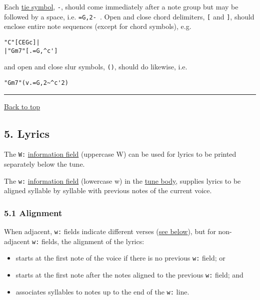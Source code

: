 Each \protect\hyperlink{ties_and_slurs}{tie symbol}, \texttt{-}, should
come immediately after a note group but may be followed by a space, i.e.
\texttt{=G,2-\ }. Open and close chord delimiters, \texttt{{[}} and
\texttt{{]}}, should enclose entire note sequences (except for chord
symbols), e.g.

\begin{verbatim}
"C"[CEGc]|
|"Gm7"[.=G,^c']
\end{verbatim}

and open and close slur symbols, \texttt{()}, should do likewise, i.e.

\begin{verbatim}
"Gm7"(v.=G,2~^c'2)
\end{verbatim}

\begin{center}\rule{0.5\linewidth}{\linethickness}\end{center}

\protect\hyperlink{}{Back to top}

\hypertarget{lyrics}{\subsection{5. Lyrics}\label{lyrics}}

The \texttt{W:}
\protect\hyperlink{information_field_definition}{information field}
(uppercase W) can be used for lyrics to be printed separately below the
tune.

The \texttt{w:}
\protect\hyperlink{information_field_definition}{information field}
(lowercase w) in the \protect\hyperlink{tune_body_definition}{tune
body}, supplies lyrics to be aligned syllable by syllable with previous
notes of the current voice.

\hypertarget{alignment}{\subsubsection{5.1 Alignment}\label{alignment}}

When adjacent, \texttt{w:} fields indicate different verses
(\protect\hyperlink{verses}{see below}), but for non-adjacent
\texttt{w:} fields, the alignment of the lyrics:

\begin{itemize}
\item
  starts at the first note of the voice if there is no previous
  \texttt{w:} field; or
\item
  starts at the first note after the notes aligned to the previous
  \texttt{w:} field; and
\item
  associates syllables to notes up to the end of the \texttt{w:} line.
\end{itemize}

